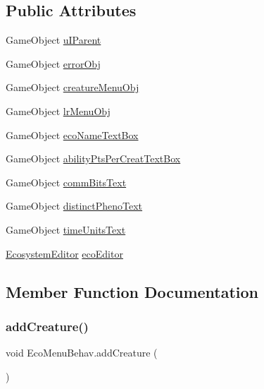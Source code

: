 \subsection*{Public Attributes}
\begin{DoxyCompactItemize}
\item 
Game\+Object \mbox{\hyperlink{class_eco_menu_behav_aa36609d2e9367f75aee215258da4fb65}{u\+I\+Parent}}
\item 
Game\+Object \mbox{\hyperlink{class_eco_menu_behav_a10793ae22e3460867efd47298d5ed492}{error\+Obj}}
\item 
Game\+Object \mbox{\hyperlink{class_eco_menu_behav_a484ff71bd9f8f8ac0e2fa8c91b89a043}{creature\+Menu\+Obj}}
\item 
Game\+Object \mbox{\hyperlink{class_eco_menu_behav_a34b16463f4306afac5cc3371b4b2d401}{lr\+Menu\+Obj}}
\item 
Game\+Object \mbox{\hyperlink{class_eco_menu_behav_ab500173b792e9b3882d2353d8bbf6184}{eco\+Name\+Text\+Box}}
\item 
Game\+Object \mbox{\hyperlink{class_eco_menu_behav_a837b1ff5d43a4fddfacf7c042d832861}{ability\+Pts\+Per\+Creat\+Text\+Box}}
\item 
Game\+Object \mbox{\hyperlink{class_eco_menu_behav_a8568e66599d356a0210a7e255e9e17c7}{comm\+Bits\+Text}}
\item 
Game\+Object \mbox{\hyperlink{class_eco_menu_behav_a7c00751f38f04592adbedc5b325f20fc}{distinct\+Pheno\+Text}}
\item 
Game\+Object \mbox{\hyperlink{class_eco_menu_behav_a369da6c213a6fbd04a4b641418714d59}{time\+Units\+Text}}
\item 
\mbox{\hyperlink{class_ecosystem_editor}{Ecosystem\+Editor}} \mbox{\hyperlink{class_eco_menu_behav_a99428835e845880ae7e65d911a1b9d2a}{eco\+Editor}}
\end{DoxyCompactItemize}


\subsection{Member Function Documentation}
\mbox{\label{class_eco_menu_behav_adbbf966a393af0f1d5893ea17f694dc1}} 
\subsubsection{\texorpdfstring{add\+Creature()}{addCreature()}}
{\footnotesize\ttfamily void Eco\+Menu\+Behav.\+add\+Creature (\begin{DoxyParamCaption}{ }\end{DoxyParamCaption})}



